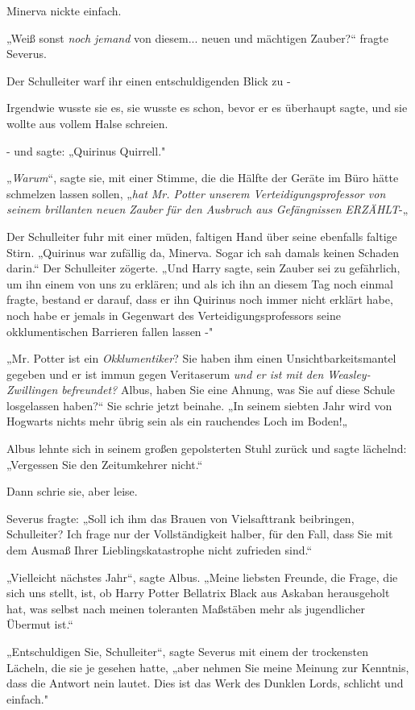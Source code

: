 {Minerva nickte einfach.

„Weiß sonst \emph{noch} \emph{jemand} von diesem... neuen und mächtigen Zauber?“ fragte Severus.

Der Schulleiter warf ihr einen entschuldigenden Blick zu -

Irgendwie wusste sie es, sie wusste es schon, bevor er es überhaupt sagte, und sie wollte aus vollem Halse schreien.

- und sagte: „Quirinus Quirrell."

„\emph{Warum}“, sagte sie, mit einer Stimme, die die Hälfte der Geräte im Büro hätte schmelzen lassen sollen, „\emph{hat Mr. Potter unserem Verteidigungsprofessor von seinem brillanten neuen Zauber für den Ausbruch aus Gefängnissen} \emph{ERZÄHLT}-„

Der Schulleiter fuhr mit einer müden, faltigen Hand über seine ebenfalls faltige Stirn. „Quirinus war zufällig da, Minerva. Sogar ich sah damals keinen Schaden darin.“ Der Schulleiter zögerte. „Und Harry sagte, sein Zauber sei zu gefährlich, um ihn einem von uns zu erklären; und als ich ihn an diesem Tag noch einmal fragte, bestand er darauf, dass er ihn Quirinus noch immer nicht erklärt habe, noch habe er jemals in Gegenwart des Verteidigungsprofessors seine okklumentischen Barrieren fallen lassen -"

„Mr. Potter ist ein \emph{Okklumentiker}? Sie haben ihm einen Unsichtbarkeitsmantel gegeben und er ist immun gegen Veritaserum \emph{und er ist mit den Weasley-Zwillingen befreundet?} Albus, haben Sie eine Ahnung, was Sie auf diese Schule losgelassen haben?“ Sie schrie jetzt beinahe. „In seinem siebten Jahr wird von Hogwarts nichts mehr übrig sein als ein rauchendes Loch im Boden!„

Albus lehnte sich in seinem großen gepolsterten Stuhl zurück und sagte lächelnd: „Vergessen Sie den Zeitumkehrer nicht.“

Dann schrie sie, aber leise.

Severus fragte: „Soll ich ihm das Brauen von Vielsafttrank beibringen, Schulleiter? Ich frage nur der Vollständigkeit halber, für den Fall, dass Sie mit dem Ausmaß Ihrer Lieblingskatastrophe nicht zufrieden sind.“

„Vielleicht nächstes Jahr“, sagte Albus. „Meine liebsten Freunde, die Frage, die sich uns stellt, ist, ob Harry Potter Bellatrix Black aus Askaban herausgeholt hat, was selbst nach meinen toleranten Maßstäben mehr als jugendlicher Übermut ist.“

„Entschuldigen Sie, Schulleiter“, sagte Severus mit einem der trockensten Lächeln, die sie je gesehen hatte, „aber nehmen Sie meine Meinung zur Kenntnis, dass die Antwort nein lautet. Dies ist das Werk des Dunklen Lords, schlicht und einfach."

}
